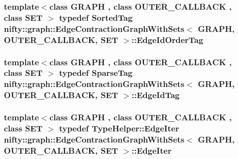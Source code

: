 \subsubsection[{Edge\+Id\+Order\+Tag}]{\setlength{\rightskip}{0pt plus 5cm}template$<$class G\+R\+A\+P\+H , class O\+U\+T\+E\+R\+\_\+\+C\+A\+L\+L\+B\+A\+C\+K , class S\+E\+T $>$ typedef {\bf Sorted\+Tag} {\bf nifty\+::graph\+::\+Edge\+Contraction\+Graph\+With\+Sets}$<$ G\+R\+A\+P\+H, O\+U\+T\+E\+R\+\_\+\+C\+A\+L\+L\+B\+A\+C\+K, S\+E\+T $>$\+::{\bf Edge\+Id\+Order\+Tag}}\label{classnifty_1_1graph_1_1EdgeContractionGraphWithSets_a6f0b9f8843ed508f1e934aee64a129a5}
\hypertarget{classnifty_1_1graph_1_1EdgeContractionGraphWithSets_a6ea951b692d5c6358003500873533f4d}{}
\subsubsection[{Edge\+Id\+Tag}]{\setlength{\rightskip}{0pt plus 5cm}template$<$class G\+R\+A\+P\+H , class O\+U\+T\+E\+R\+\_\+\+C\+A\+L\+L\+B\+A\+C\+K , class S\+E\+T $>$ typedef {\bf Sparse\+Tag} {\bf nifty\+::graph\+::\+Edge\+Contraction\+Graph\+With\+Sets}$<$ G\+R\+A\+P\+H, O\+U\+T\+E\+R\+\_\+\+C\+A\+L\+L\+B\+A\+C\+K, S\+E\+T $>$\+::{\bf Edge\+Id\+Tag}}\label{classnifty_1_1graph_1_1EdgeContractionGraphWithSets_a6ea951b692d5c6358003500873533f4d}
\hypertarget{classnifty_1_1graph_1_1EdgeContractionGraphWithSets_abfc56b6e721306de50e308e7b199b18c}{}
\subsubsection[{Edge\+Iter}]{\setlength{\rightskip}{0pt plus 5cm}template$<$class G\+R\+A\+P\+H , class O\+U\+T\+E\+R\+\_\+\+C\+A\+L\+L\+B\+A\+C\+K , class S\+E\+T $>$ typedef {\bf Type\+Helper\+::\+Edge\+Iter} {\bf nifty\+::graph\+::\+Edge\+Contraction\+Graph\+With\+Sets}$<$ G\+R\+A\+P\+H, O\+U\+T\+E\+R\+\_\+\+C\+A\+L\+L\+B\+A\+C\+K, S\+E\+T $>$\+::{\bf Edge\+Iter}}\label{classnifty_1_1graph_1_1EdgeContractionGraphWithSets_abfc56b6e721306de50e308e7b199b18c}
\hypertarget{classnifty_1_1graph_1_1EdgeContractionGraphWithSets_abadbbebcd10e37a1a3f59bb967accdf0}{}
